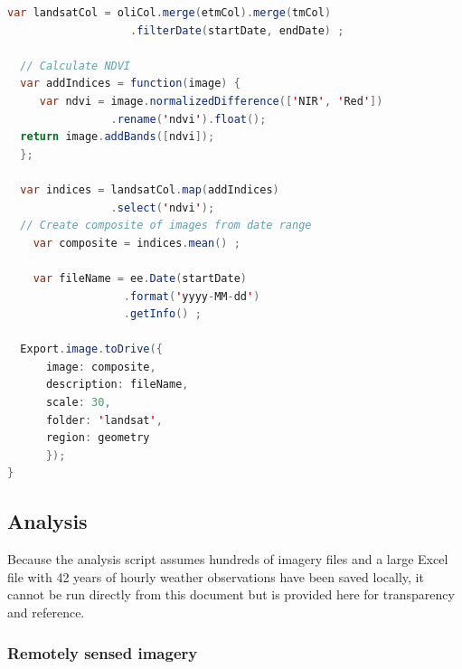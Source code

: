 \documentclass[
]{article}
\begin{document}
\begin{lstlisting}[language=Java]
  var landsatCol = oliCol.merge(etmCol).merge(tmCol)
                   .filterDate(startDate, endDate) ;
  
  // Calculate NDVI 
  var addIndices = function(image) {
     var ndvi = image.normalizedDifference(['NIR', 'Red'])
                .rename('ndvi').float();
  return image.addBands([ndvi]);
  };
  
  var indices = landsatCol.map(addIndices) 
                .select('ndvi');
  // Create composite of images from date range
    var composite = indices.mean() ; 
  
    var fileName = ee.Date(startDate) 
                  .format('yyyy-MM-dd')
                  .getInfo() ;

  Export.image.toDrive({
      image: composite,
      description: fileName,
      scale: 30,
      folder: 'landsat', 
      region: geometry
      });
}
\end{lstlisting}

\newpage

\subsection{Analysis}\label{analysis}

Because the analysis script assumes hundreds of imagery files and a
large Excel file with 42 years of hourly weather observations have been
saved locally, it cannot be run directly from this document but is
provided here for transparency and reference.

\subsubsection{Remotely sensed imagery}\label{remotely-sensed-imagery}
\end{document}
